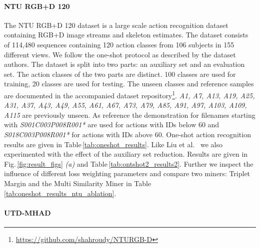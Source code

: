 \documentclass[10pt,conference,a4paper]{IEEEtran}
\def\andothers{et al.\ }
\def\figname{Fig.\,}
\def\tabname{Table\,}
\begin{document}
\paragraph{NTU RGB+D 120}
The NTU RGB+D 120 \cite{liu2019ntu} dataset is a large scale action recognition dataset containing RGB+D image streams and skeleton estimates. 
The dataset consists of 114,480 sequences containing 120 action classes from 106 subjects in 155 different views.
We follow the one-shot protocol as described by the dataset authors. The dataset is split into two parts: an auxiliary set and an evaluation set. The action classes of the two parts are distinct. 100 classes are used for training, 20 classes are used for testing. The unseen classes and reference samples are documented in the accompanied dataset repository\footnote{\url{https://github.com/shahroudy/NTURGB-D}}. \textit{A1, A7, A13, A19, A25, A31, A37, A43, A49, A55, A61, A67, A73, A79, A85, A91, A97, A103, A109, A115} are previously unseen. As reference the demonstration for filenames starting with \textit{S001C003P008R001*} are used for actions with IDs below 60 and \textit{S018C003P008R001*} for actions with IDs above 60.
One-shot action recognition results are given in \tabname \ref{tab:oneshot_results}. Like Liu \andothers \cite{liu2019ntu} we also experimented with the effect of the auxiliary set reduction. Results are given in \figname \ref{fig:result_figs} \textit{(a)} and \tabname \ref{tab:ontshot2_results2}. Further we inspect the influence of different loss weighting parameters and compare two miners: Triplet Margin \cite{schroff2015facenet} and the Multi Similarity Miner \cite{wang2019multi} in \tabname \ref{tab:oneshot_results_ntu_ablation}. 


\paragraph{UTD-MHAD}
\end{document}
